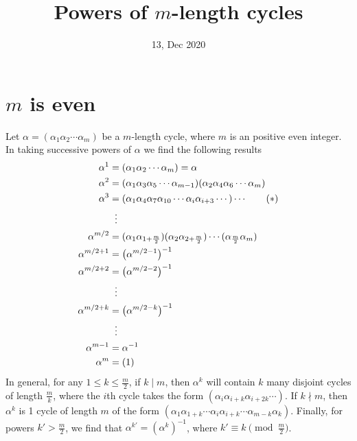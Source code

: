 \documentclass[leqno]{article}
\theoremstyle{definition}
\theoremstyle{remark}
\begin{document}
\title{Powers of $m$-length cycles}
\author{}
\date{13, Dec 2020}
\maketitle
    
    \section{$m$ is even}
    Let $\alpha=(\alpha_1\alpha_2\cdots\alpha_{m})$ be a $m$-length cycle, where $m$ is an positive even integer. In taking successive powers of $\alpha$ we find the following results
        \begin{align*}
            \alpha^1&=(\alpha_1\alpha_2\cdots\alpha_m)=\alpha \\
            \alpha^2&=(\alpha_1\alpha_3\alpha_5\cdots\alpha_{m-1})(\alpha_2\alpha_4\alpha_6\cdots\alpha_m) \\
            \alpha^3&=(\alpha_1\alpha_4\alpha_7\alpha_{10}\cdots\alpha_i\alpha_{i+3}\cdots)\cdots\quad\quad (*) \\
            &\hspace{2mm}\vdots \\
            \alpha^{m/2}&=(\alpha_1\alpha_{1+\frac{m}{2}})(\alpha_2\alpha_{2+\frac{m}{2}})\cdots(\alpha_{\frac{m}{2}}\alpha_m) \\
            \alpha^{m/2+1}&=\big(\alpha^{m/2-1}\big)^{-1} \\
            \alpha^{m/2+2}&=\big(\alpha^{m/2-2}\big)^{-1} \\
            &\hspace{2mm}\vdots \\
            \alpha^{m/2+k}&=\big(\alpha^{m/2-k}\big)^{-1} \\
            &\hspace{2mm}\vdots \\
            \alpha^{m-1}&=\alpha^{-1} \\
            \alpha^m&=(1)
        \end{align*}
    In general, for any $1\leq k\leq \frac{m}{2}$, if $k\mid m$, then $\alpha^k$ will contain $k$ many disjoint cycles of length $\frac{m}{k}$, where the $i$th cycle takes the form $(\alpha_i\alpha_{i+k}\alpha_{i+2k}\cdots)$. If $k\nmid m$, then $\alpha^k$ is 1 cycle of length $m$ of the form $(\alpha_1\alpha_{1+k}\cdots\alpha_{i}\alpha_{i+k}\cdots\alpha_{m-k}\alpha_{k})$. Finally, for powers $k'>\frac{m}{2}$, we find that $\alpha^{k'}=(\alpha^{k})^{-1}$, where $k'\equiv k\pmod{\frac{m}{2}}$.
    
    
\end{document}
